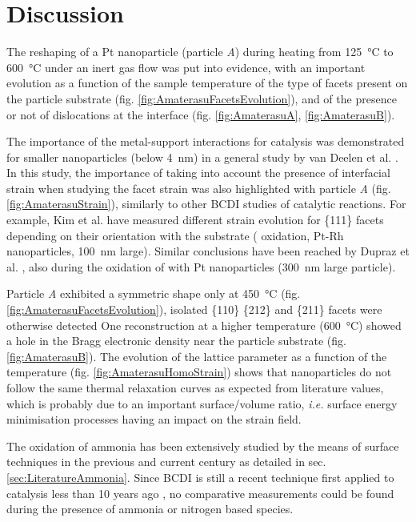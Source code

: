 \section{Discussion}

The reshaping of a Pt nanoparticle (particle \textit{A}) during heating from \qty{125}{\degreeCelsius} to \qty{600}{\degreeCelsius} under an inert gas flow was put into evidence, with an important evolution as a function of the sample temperature of the type of facets present on the particle substrate (fig. \ref{fig:AmaterasuFacetsEvolution}), and of the presence or not of dislocations at the interface (fig. \ref{fig:AmaterasuA}, \ref{fig:AmaterasuB}).

The importance of the metal-support interactions for catalysis was demonstrated for smaller nanoparticles (below \qty{4}{\nm}) in a general study by van Deelen et al. \parencite*{vanDeelen2019}.
In this study, the importance of taking into account the presence of interfacial strain when studying the facet strain was also highlighted with particle \textit{A} (fig. \ref{fig:AmaterasuStrain}), similarly to other BCDI studies of catalytic reactions.
For example, Kim et al. \parencite*{Kim2021} have measured different strain evolution for \{111\} facets depending on their orientation with the  substrate ( oxidation, Pt-Rh nanoparticles, \qty{100}{\nm} large).
Similar conclusions have been reached by Dupraz et al. \parencite*{Dupraz2022}, also during the oxidation of  with Pt nanoparticles (\qty{300}{\nm} large particle).

Particle \textit{A} exhibited a symmetric shape only at \qty{450}{\degreeCelsius} (fig. \ref{fig:AmaterasuFacetsEvolution}), isolated \{110\} \{212\} and \{211\} facets were otherwise detected
One reconstruction at a higher temperature (\qty{600}{\degreeCelsius}) showed a hole in the Bragg electronic density near the particle substrate (fig. \ref{fig:AmaterasuB}).
The evolution of the lattice parameter as a function of the temperature (fig. \ref{fig:AmaterasuHomoStrain}) shows that nanoparticles do not follow the same thermal relaxation curves as expected from literature values, which is probably due to an important surface/volume ratio, \textit{i.e.} surface energy minimisation processes \parencite{Winterbottom1967, Boukouvala2021} having an impact on the strain field.

The oxidation of ammonia has been extensively studied by the means of surface techniques in the previous and current century as detailed in sec. \ref{sec:LiteratureAmmonia}.
Since BCDI is still a recent technique first applied to catalysis less than 10 years ago \parencite{Ulvestad2016}, no comparative measurements could be found during the presence of ammonia or nitrogen based species.


